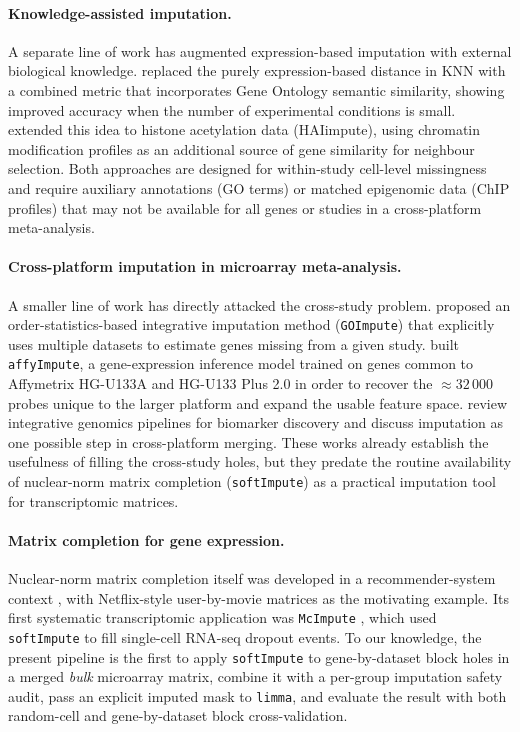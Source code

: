 \documentclass[11pt,a4paper]{article}
\begin{document}
\paragraph{Knowledge-assisted imputation.}
A separate line of work has augmented expression-based imputation
with external biological knowledge.
\citet{Tuikkala2006} replaced the purely expression-based distance
in KNN with a combined metric that incorporates Gene Ontology
semantic similarity, showing improved accuracy when the number of
experimental conditions is small.
\citet{Tuikkala2008} extended this idea to histone acetylation
data (HAIimpute), using chromatin modification profiles as an
additional source of gene similarity for neighbour selection.
Both approaches are designed for within-study cell-level
missingness and require auxiliary annotations (GO terms) or
matched epigenomic data (ChIP profiles) that may not be available
for all genes or studies in a cross-platform meta-analysis.

\paragraph{Cross-platform imputation in microarray
meta-analysis.}
A smaller line of work has directly attacked the cross-study
problem. \citet{Hu2006} proposed an order-statistics-based
integrative imputation method (\texttt{GOImpute}) that explicitly uses
multiple datasets to estimate genes missing from a given study.
\citet{Zhou2017} built \texttt{affyImpute}, a gene-expression
inference model trained on genes common to Affymetrix HG-U133A
and HG-U133 Plus 2.0 in order to recover the $\approx 32\,000$
probes unique to the larger platform and expand the usable
feature space. \citet{Walsh2015} review integrative genomics
pipelines for biomarker discovery and discuss imputation as one
possible step in cross-platform merging. These works already
establish the usefulness of filling the cross-study holes, but
they predate the routine availability of nuclear-norm matrix
completion (\texttt{softImpute}) as a practical imputation tool
for transcriptomic matrices.

\paragraph{Matrix completion for gene expression.}
Nuclear-norm matrix completion itself was developed in a
recommender-system context \citep{Mazumder2010, Hastie2015},
with Netflix-style user-by-movie matrices as the motivating
example. Its first systematic transcriptomic application was
\texttt{McImpute} \citep{Mongia2019}, which used \texttt{softImpute}
to fill single-cell RNA-seq dropout events. To our knowledge,
the present pipeline is the first to apply \texttt{softImpute}
to gene-by-dataset block holes in a merged \emph{bulk}
microarray matrix, combine it with a per-group imputation safety
audit, pass an explicit imputed mask to \texttt{limma}, and
evaluate the result with both random-cell and gene-by-dataset
block cross-validation.
\end{document}
